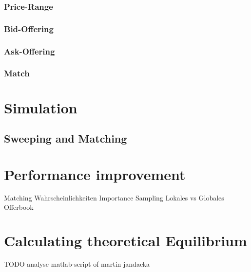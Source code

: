 \documentclass[Bachelorarbeit.tex]{subfiles}
\begin{document}
\subsubsection{Price-Range}
\subsubsection{Bid-Offering}
\subsubsection{Ask-Offering}
\subsubsection{Match}

\section{Simulation}
\subsection{Sweeping and Matching}
\label{sec:implementation_sweepingAndMatching}

\section{Performance improvement}
\label{sec:implementation_performanceImprovement}
Matching Wahrscheinlichkeiten
Importance Sampling
Lokales vs Globales Offerbook
		
\section{Calculating theoretical Equilibrium}
TODO analyse matlab-script of martin jandacka
\end{document}
